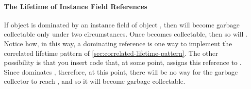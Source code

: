 \paragraph{The Lifetime of Instance Field References}
If object  is dominated by an instance field of object , then
 will become garbage collectable only under two circumstances. Once
 becomes collectable, then so will . Notice how, in this way, a
dominating reference is one way to implement the correlated lifetime pattern of
\autoref{sec:correlated-lifetime-pattern}. The other possibility is that you
insert code that, at some point, assigns this reference to . Since
 dominates , therefore, at this point, there will be no way for
the garbage collector to reach , and so it will become garbage
collectable.

